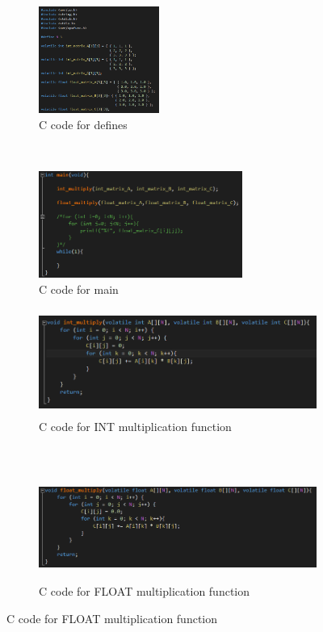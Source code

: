 \documentclass{article}
\begin{document}
	\begin{figure}[h!]
		\centering
		\begin{subfigure}[t]{0.5\textwidth}
			\centering
			\includegraphics[height=3.5cm, width=\linewidth]{./results/lab10_defineS.png}
			\caption{C code for defines}
		\end{subfigure}%
		~
		\begin{subfigure}[t]{0.5\textwidth}
			\centering
			\includegraphics[height=3.5cm, width=\linewidth]{./results/lab10_main.png}
			\caption{C code for main}
		\end{subfigure}
	
		\begin{subfigure}[t]{0.5\textwidth}
			\centering
			\includegraphics[height=3.5cm, width=\linewidth]{./results/lab10_int_multiplication.png}
			\caption{C code for INT multiplication function}
		\end{subfigure}%
		~
		\begin{subfigure}[t]{0.5\textwidth}
			\centering
			\includegraphics[height=3.5cm, width=\linewidth]{./results/lab10_float_multiplication.png}
			\caption{C code for FLOAT multiplication function}
		\end{subfigure}
	\end{figure}
	
\end{document}
